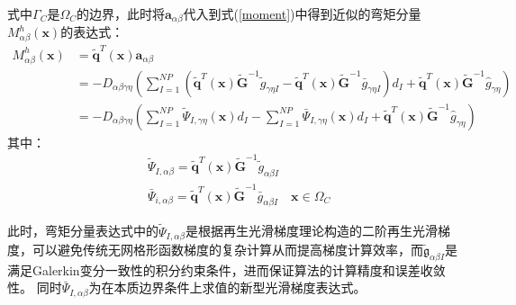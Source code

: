 式中$\Gamma_C$是$\Omega_C$的边界，此时将$\pmb{a}_{\alpha\beta}$代入到式(\ref{moment})中得到近似的弯矩分量$M^h_{\alpha\beta}(\pmb{x})$的表达式：
\begin{equation}
\begin{split}
M^h_{\alpha\beta}(\pmb{x})&=\tilde{\pmb{q}}^T(\pmb{x})\pmb a_{\alpha\beta}\\
&=-D_{\alpha\beta\gamma\eta}(\sum_{I=1}^{N\!P}(\tilde{\pmb q}^T(\pmb x)\tilde{\pmb G}^{-1}\tilde{g}_{\gamma\eta I}-\tilde{\pmb q}^T(\pmb x)\tilde{\pmb G}^{-1}\bar{g}_{\gamma\eta I})d_I+\tilde{\pmb q}^T(\pmb x)\tilde{\pmb G}^{-1}\hat{g}_{\gamma\eta})\\
&=-D_{\alpha\beta\gamma\eta}(\sum_{I=1}^{N\!P}\tilde{\Psi}_{I,\gamma\eta}(\pmb x)d_I-\sum_{I=1}^{N\!P}\bar{\Psi}_{I,\gamma\eta}(\pmb{x})d_I+\tilde{\pmb q}^T(\pmb x)\tilde{\pmb G}^{-1}\hat{g}_{\gamma\eta})
\end{split}
\end{equation}
其中：
\begin{align}
 \label{PTPSI}&\tilde{\Psi}_{I,\alpha\beta}=\tilde{\pmb q}^T(\pmb x)\tilde{\pmb G}^{-1}\tilde{g}_{\alpha\beta I}\\
 \label{PBPSI}&\bar{\Psi}_{i,\alpha\beta}=\tilde{\pmb q}^T(\pmb x)\tilde{\pmb G}^{-1}\bar{g}_{\alpha\beta I}\quad \pmb{x}\in\Omega_C
\end{align}\par
此时，弯矩分量表达式中的$\tilde{\Psi}_{I,\alpha\beta}$是根据再生光滑梯度理论\cite{}构造的二阶再生光滑梯度，可以避免传统无网格形函数梯度的复杂计算从而提高梯度计算效率，而$\tilde{\mathfrak{g}}_{\alpha\beta I}$是满足Galerkin变分一致性的积分约束条件，进而保证算法的计算精度和误差收敛性。
同时$\bar{\Psi}_{I,\alpha\beta}$为在本质边界条件上求值的新型光滑梯度表达式。
